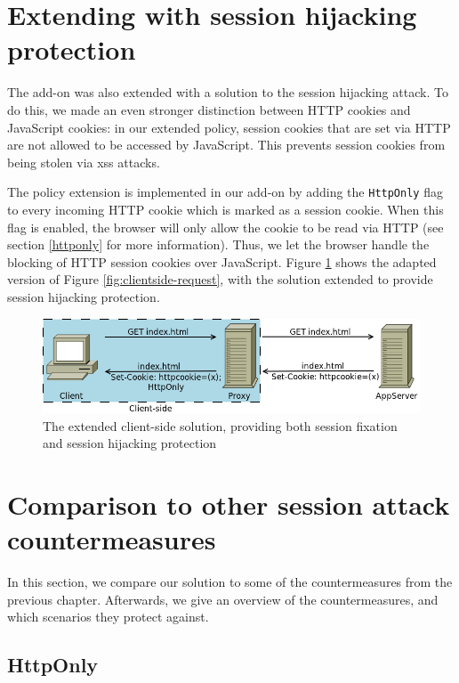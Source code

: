 \section{Extending with session hijacking protection}

The add-on was also extended with a solution to the session hijacking attack. To do this, we made an even stronger distinction between HTTP cookies and JavaScript cookies: in our extended policy, session cookies that are set via HTTP are not allowed to be accessed by JavaScript. This prevents session cookies from being stolen via \gls{xss} attacks.

The policy extension is implemented in our add-on by adding the \texttt{HttpOnly} flag to every incoming HTTP cookie which is marked as a session cookie. When this flag is enabled, the browser will only allow the cookie to be read via HTTP (see section \ref{httponly} for more information). Thus, we let the browser handle the blocking of HTTP session cookies over JavaScript. Figure \ref{fig:clientside-httponly} shows the adapted version of Figure \ref{fig:clientside-request}, with the solution extended to provide session hijacking protection.

\begin{figure}[htb]
	\centering
	\includegraphics[width=.7\textwidth]{img/clientside-proxy-3.png}
	\caption[The extended client-side solution]{The extended client-side solution, providing both session fixation and session hijacking protection}
	\label{fig:clientside-httponly}
\end{figure}
 
\section{Comparison to other session attack countermeasures}\label{related-work}%

In this section, we compare our solution to some of the countermeasures from the previous chapter. Afterwards, we give an overview of the countermeasures, and which scenarios they protect against. %

\subsection{HttpOnly}\label{httponlyremark}

